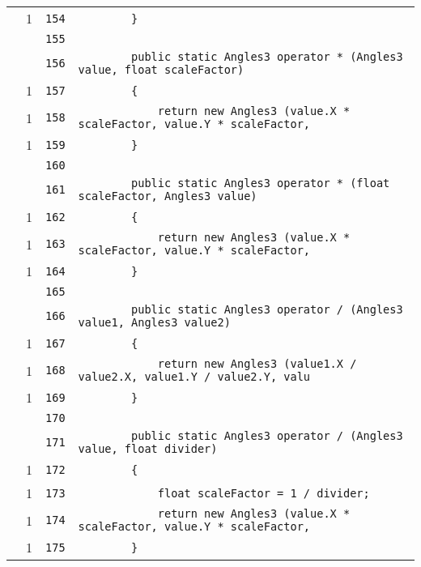 \documentclass[a4paper,10pt]{article}
\begin{document}
\begin{longtable}[l]{lrrl}
\cellcolor{green} & 1 & \verb~154~ & \verb~        }~\\
\cellcolor{gray} &  & \verb~155~ & \verb~~\\
\cellcolor{gray} &  & \verb~156~ & \verb~        public static Angles3 operator * (Angles3 value, float scaleFactor)~\\
\cellcolor{green} & 1 & \verb~157~ & \verb~        {~\\
\cellcolor{green} & 1 & \verb~158~ & \verb~            return new Angles3 (value.X * scaleFactor, value.Y * scaleFactor, ~\\
\cellcolor{green} & 1 & \verb~159~ & \verb~        }~\\
\cellcolor{gray} &  & \verb~160~ & \verb~~\\
\cellcolor{gray} &  & \verb~161~ & \verb~        public static Angles3 operator * (float scaleFactor, Angles3 value)~\\
\cellcolor{green} & 1 & \verb~162~ & \verb~        {~\\
\cellcolor{green} & 1 & \verb~163~ & \verb~            return new Angles3 (value.X * scaleFactor, value.Y * scaleFactor, ~\\
\cellcolor{green} & 1 & \verb~164~ & \verb~        }~\\
\cellcolor{gray} &  & \verb~165~ & \verb~~\\
\cellcolor{gray} &  & \verb~166~ & \verb~        public static Angles3 operator / (Angles3 value1, Angles3 value2)~\\
\cellcolor{green} & 1 & \verb~167~ & \verb~        {~\\
\cellcolor{green} & 1 & \verb~168~ & \verb~            return new Angles3 (value1.X / value2.X, value1.Y / value2.Y, valu~\\
\cellcolor{green} & 1 & \verb~169~ & \verb~        }~\\
\cellcolor{gray} &  & \verb~170~ & \verb~~\\
\cellcolor{gray} &  & \verb~171~ & \verb~        public static Angles3 operator / (Angles3 value, float divider)~\\
\cellcolor{green} & 1 & \verb~172~ & \verb~        {~\\
\cellcolor{green} & 1 & \verb~173~ & \verb~            float scaleFactor = 1 / divider;~\\
\cellcolor{green} & 1 & \verb~174~ & \verb~            return new Angles3 (value.X * scaleFactor, value.Y * scaleFactor, ~\\
\cellcolor{green} & 1 & \verb~175~ & \verb~        }~\\

\end{longtable}
\end{document}

